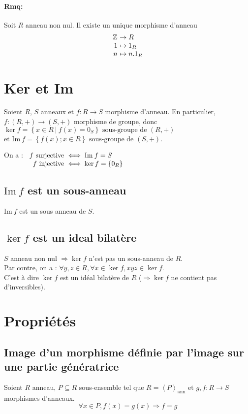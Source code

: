 \documentclass[reqno,a4paper,10pt]{report}
\newcommand{\gen}[1]{\left\langle #1 \right\rangle} %
\newcommand{\set}[1]{\left\lbrace #1 \right\rbrace} %
\newcommand{\im}{\mathrm{Im}\:} %
\newcommand{\IZ}{\ensuremath{\mathbb{Z}}\xspace} %
\newcommand{\so}{\Rightarrow}
\newcommand{\such}{\ | \ }
\newcommand{\genann}[1]{\gen{#1}_{\text{ann}}} %
\begin{document}
\paragraph{Rmq:}
Soit $R$ anneau non nul. Il existe un unique morphisme d'anneau
\[\begin{array}{r@{\ }l}
  \IZ &\to R\\
  1 &\mapsto 1_R\\
  n &\mapsto n.1_R
\end{array}\]


\section{Ker et Im}
Soient $R$, $S$ anneaux et $f: R \to S$ morphisme d'anneau. En particulier,
$f: (R,+) \to (S,+)$ morphisme de groupe, donc $\ker f = \set{x \in R
\such f(x) = 0_S} \text{ sous-groupe de } (R,+)$\\
et $\im f = \set{f(x) ; x \in R} \text{ sous-groupe de } (S,+)$.

On a : $
\begin{array}[t]{r@{\ }l}
  f \text{ surjective} &\iff \im f = S\\
  f \text{ injective} &\iff \ker f = \set{0_R}
\end{array}$

\subsection{$\im f$ est un sous-anneau}
$\im f$ est un sous anneau de $S$.

\subsection{$\ker f$ est un ideal bilatère}
$S$ anneau non nul $\so \ker f$ n'est pas un sous-anneau de $R$.\\
Par contre, on a : $\forall y,z \in R, \forall x \in \ker f, xyz \in \ker
f$.\\
C'est à dire $\ker f$ est un idéal bilatère de $R$ ($\so \ker f$ ne
contient pas d'inversibles).

\section{Propriétés}
\subsection{Image d'un morphisme définie par l'image sur une partie
génératrice}
Soient $R$ anneau, $P\subseteq R$ sous-ensemble tel que $R=\genann{P}$
et $g, f : R \to S$ morphismes d'anneaux.
\[\forall x \in P, f(x)=g(x) \so f=g\]
\end{document}
